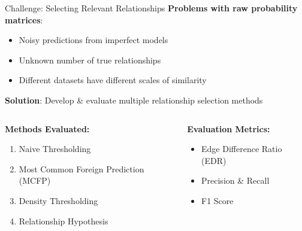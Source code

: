 \documentclass[aspectratio=169]{beamer}
\begin{document}
\begin{frame}{Challenge: Selecting Relevant Relationships}
    \textbf{Problems with raw probability matrices}:
    \begin{itemize}
        \item Noisy predictions from imperfect models
        \item Unknown number of true relationships
        \item Different datasets have different scales of similarity
    \end{itemize}

    \vspace{1em}

    \textbf{Solution}: Develop \& evaluate multiple relationship selection methods

    \vspace{1em}

    \begin{columns}[T]
        \begin{column}{0.48\textwidth}
            \textbf{Methods Evaluated:}
            \begin{enumerate}
                \item Naive Thresholding
                \item Most Common Foreign Prediction (MCFP)
                \item Density Thresholding
                \item Relationship Hypothesis
            \end{enumerate}
        \end{column}

        \begin{column}{0.48\textwidth}
            \textbf{Evaluation Metrics:}
            \begin{itemize}
                \item Edge Difference Ratio (EDR)
                \item Precision \& Recall
                \item F1 Score
            \end{itemize}
        \end{column}
    \end{columns}
\end{frame}
\end{document}
